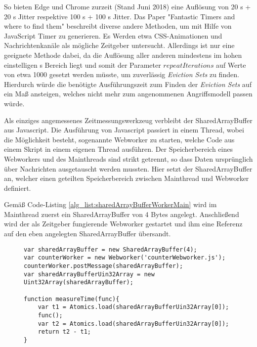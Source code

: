 So bieten Edge und Chrome zurzeit (Stand Juni 2018) eine Auflösung von 20 \textmu s + 20 \textmu s Jitter respektive 100 \textmu s + 100 \textmu s Jitter.
Das Paper "Fantastic Timers and where to find them" \cite{FantasticTimers} beschreibt diverse andere Methoden, um mit Hilfe von JavaScript Timer zu generieren. 
Es Werden etwa CSS-Animationen und Nachrichtenkanäle als mögliche Zeitgeber untersucht.
Allerdings ist nur eine geeignete Methode dabei, da die Auflösung aller anderen mindestens im hohen einstelligen \textmu s Bereich liegt und somit der Parameter $repeatIterations$ auf Werte von etwa 1000 gesetzt werden müsste, um zuverlässig \textit{Eviction Sets} zu finden. 
Hierdurch würde die benötigte Ausführungszeit zum Finden der \textit{Eviction Sets} auf ein Maß ansteigen, welches nicht mehr zum angenommenen Angriffsmodell passen würde.


Als einziges angemessenes Zeitmessungswerkzeug verbleibt der SharedArrayBuffer aus Javascript. 
Die Ausführung von Javascript passiert in einem Thread, wobei die Möglichkeit besteht, sogenannte Webworker zu starten, welche Code aus einem Skript in einem eigenen Thread ausführen.
Der Speicherbereich eines Webworkers und des Mainthreads sind strikt getrennt, so dass Daten ursprünglich über Nachrichten ausgetauscht werden mussten. Hier setzt der SharedArrayBuffer an, welcher einen geteilten Speicherbereich zwischen Mainthread und Webworker definiert.

Gemäß Code-Listing \ref{alg_list:sharedArrayBufferWorkerMain} wird im Mainthread zuerst ein SharedArrayBuffer von 4 Bytes angelegt. Anschließend wird der als Zeitgeber fungierende Webworker gestartet und ihm eine Referenz auf den eben angelegten SharedArrayBuffer übersandt. 

\begin{figure}[h]
\begin{lstlisting}[caption=main.js: Code welcher den counterWorker für Zeitmessungen verwendet,label=alg_list:sharedArrayBufferWorkerMain]
var sharedArrayBuffer = new SharedArrayBuffer(4);
var counterWorker = new Webworker('counterWebworker.js');
counterWorker.postMessage(sharedArrayBuffer);
var sharedArrayBufferUin32Array = new Uint32Array(sharedArrayBuffer);

function measureTime(func){
    var t1 = Atomics.load(sharedArrayBufferUin32Array[0]);
    func();
    var t2 = Atomics.load(sharedArrayBufferUin32Array[0]);
    return t2 - t1;
}
\end{lstlisting}
\end{figure}


